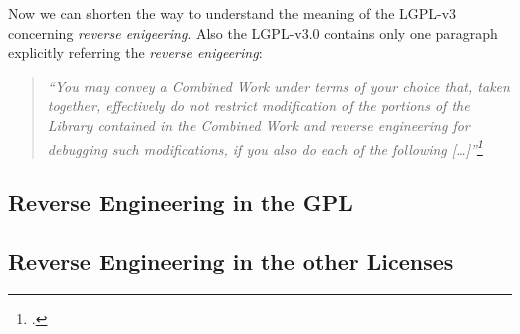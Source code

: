 Now we can shorten the way to understand the meaning of the LGPL-v3 concerning
\emph{reverse enigeering}. Also the LGPL-v3.0 contains only one paragraph
explicitly referring the \emph{reverse enigeering}:


\begin{quote}\emph{
\enquote{You may convey a Combined Work under terms of your choice that,
taken together, effectively \emph{do not restrict} modification of the portions
of the Library contained in the Combined Work and \emph{reverse engineering} for
debugging such modifications, if you also do each of the following
[\ldots]}\footcite[cf.][\nopage wp]{Lgpl30OsiLicense2007a}}
\end{quote}


\subsection{Reverse Engineering in the GPL}

\subsection{Reverse Engineering in the other Licenses}













%
